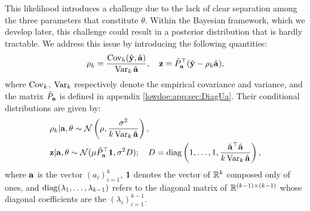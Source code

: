 {
This likelihood introduces a challenge due to the lack of clear separation among the three parameters that constitute $\theta$. Within the Bayesian framework, which we develop later, this challenge could result in a posterior distribution that is hardly tractable. We address this issue by introducing the following quantities:
}
    \begin{equation}
        \rho_k = \frac{\operatorname{Cov}_k(\hat{\mathbf{y}},\hat{\mathbf{a}})}{\operatorname{Var}_k\hat{\mathbf{a}}}, \quad
        \mathbf{z} = \tilde P_{\mathbf{a}}^{\top}(\hat{\mathbf{y}} - \rho_k\hat{\mathbf{a}}) ,
    \end{equation}
where $\operatorname{Cov}_k$, $\operatorname{Var}_k$ respectively denote the empirical covariance and variance, and the matrix $\tilde P_{\mathbf{a}}$ is defined in appendix \ref{lowdoe:app:sec:DiagUa}.
Their conditional distributions are given by:
    \begin{align}
        &  \rho_k|\mbf a,\theta \sim \cN\left( \rho,\frac{\sigma^2}{k\Var_k\hatmbf a} \right), \\
        &   \mbf z | \mbf a, \theta \sim  \cN(\mu\tilde P_{\mbf a}^{\top}\mbf 1,\sigma^2D);\quad D=\diag\left(1,\dots,1,\frac{\hatmbf a^{\top}\hatmbf a}{k\Var_k\hatmbf a}\right), %
    \end{align}
where $\mathbf{a}$ is the vector $(a_i)_{i=1}^k$, $\mathbf{1}$ denotes the vector of $\mathbb{R}^k$ composed only of ones, and $\operatorname{diag}(\lambda_1,\dots,\lambda_{k-1}) $ refers to the diagonal matrix of $\mathbb{R}^{(k-1)\times(k-1)}$ whose diagonal coefficients are the $(\lambda_i)_{i=1}^{k-1}$. 

